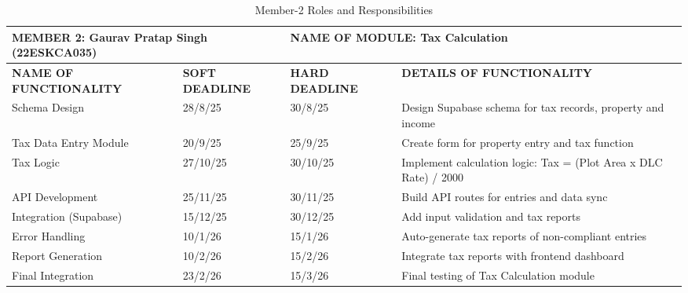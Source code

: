 \begin{table}[H]
\begin{center}
 \begin{tabular}{| m{4cm} | m{2.5cm} | m{2.5cm}| m{5cm}| } 
\hline
\multicolumn{2}{|l|}{MEMBER 2: Gaurav Pratap Singh (22ESKCA035)}&
\multicolumn{2}{|l|}{NAME OF MODULE: Tax Calculation}\\
\hline
\textbf{NAME OF FUNCTIONALITY} & \textbf{SOFT DEADLINE} & \textbf{HARD DEADLINE} & \textbf{DETAILS OF FUNCTIONALITY} \\ 
\hline
Schema Design & 28/8/25 & 30/8/25 & Design Supabase schema for tax records, property and income \\
\hline
Tax Data Entry Module & 20/9/25 & 25/9/25 & Create form for property entry and tax function \\
\hline
Tax Logic & 27/10/25 & 30/10/25 & Implement calculation logic: Tax = (Plot Area x DLC Rate) / 2000 \\
\hline
API Development & 25/11/25 & 30/11/25 & Build API routes for entries and data sync \\
\hline
Integration (Supabase) & 15/12/25 & 30/12/25 & Add input validation and tax reports \\
\hline
Error Handling & 10/1/26 & 15/1/26 & Auto-generate tax reports of non-compliant entries \\
\hline
Report Generation & 10/2/26 & 15/2/26 & Integrate tax reports with frontend dashboard \\
\hline
Final Integration & 23/2/26 & 15/3/26 & Final testing of Tax Calculation module \\
\hline
\end{tabular}
\caption{Member-2 Roles and Responsibilities}
\end{center}
\end{table}


